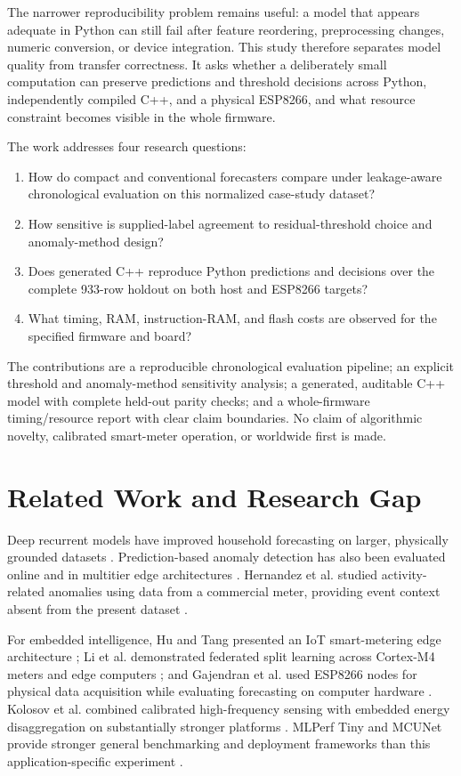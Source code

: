 \documentclass[10pt,a4paper,twocolumn]{article}
\begin{document}
The narrower reproducibility problem remains useful: a model that appears adequate in Python can still fail after feature reordering, preprocessing changes, numeric conversion, or device integration. This study therefore separates model quality from transfer correctness. It asks whether a deliberately small computation can preserve predictions and threshold decisions across Python, independently compiled C++, and a physical ESP8266, and what resource constraint becomes visible in the whole firmware.

The work addresses four research questions:
\begin{enumerate}
    \item How do compact and conventional forecasters compare under leakage-aware chronological evaluation on this normalized case-study dataset?
    \item How sensitive is supplied-label agreement to residual-threshold choice and anomaly-method design?
    \item Does generated C++ reproduce Python predictions and decisions over the complete 933-row holdout on both host and ESP8266 targets?
    \item What timing, RAM, instruction-RAM, and flash costs are observed for the specified firmware and board?
\end{enumerate}

The contributions are a reproducible chronological evaluation pipeline; an explicit threshold and anomaly-method sensitivity analysis; a generated, auditable C++ model with complete held-out parity checks; and a whole-firmware timing/resource report with clear claim boundaries. No claim of algorithmic novelty, calibrated smart-meter operation, or worldwide first is made.

\section{Related Work and Research Gap}
Deep recurrent models have improved household forecasting on larger, physically grounded datasets \cite{shi2018pooling,kong2019lstm,aurangzeb2024bilstm}. Prediction-based anomaly detection has also been evaluated online and in multitier edge architectures \cite{liu2018scalable,utomo2020multitiered}. Hernandez et al. studied activity-related anomalies using data from a commercial meter, providing event context absent from the present dataset \cite{hernandez2024daily}.

For embedded intelligence, Hu and Tang presented an IoT smart-metering edge architecture \cite{hu2020edge}; Li et al. demonstrated federated split learning across Cortex-M4 meters and edge computers \cite{li2024federated}; and Gajendran et al. used ESP8266 nodes for physical data acquisition while evaluating forecasting on computer hardware \cite{gajendran2026ihems}. Kolosov et al. combined calibrated high-frequency sensing with embedded energy disaggregation on substantially stronger platforms \cite{kolosov2025instrumental}. MLPerf Tiny and MCUNet provide stronger general benchmarking and deployment frameworks than this application-specific experiment \cite{banbury2021mlperf,lin2020mcunet}.
\end{document}
